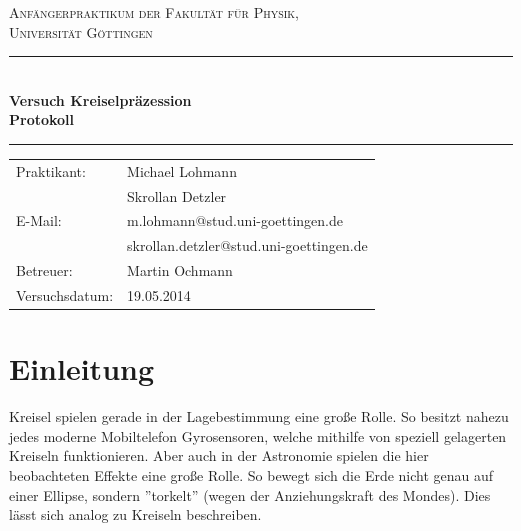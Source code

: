 \documentclass[12pt,a4paper,titlepage,headinclude,bibtotoc]{scrartcl}
\begin{document}
\begin{titlepage}
\centering
\textsc{\Large Anfängerpraktikum der Fakultät für
  Physik,\\[1.5ex] Universität Göttingen}

\vspace*{4.2cm}

\rule{\textwidth}{1pt}\\[0.5cm]
{\huge \bfseries
  Versuch Kreiselpräzession\\[1.5ex]
  Protokoll}\\[0.5cm]
\rule{\textwidth}{1pt}

\vspace*{3.5cm}

\begin{Large}
\begin{tabular}{ll}
Praktikant: &  Michael Lohmann\\
 &  Skrollan Detzler\\
 E-Mail: & m.lohmann@stud.uni-goettingen.de\\
 &  skrollan.detzler@stud.uni-goettingen.de\\
 Betreuer: & Martin Ochmann\\
 Versuchsdatum: & 19.05.2014\\
\end{tabular}
\end{Large}

\vspace*{0.8cm}

\begin{Large}
\end{Large}

\end{titlepage}

\tableofcontents

\newpage

\section{Einleitung}
\label{sec:einleitung}
Kreisel spielen gerade in der Lagebestimmung eine große Rolle.
So besitzt nahezu jedes moderne Mobiltelefon Gyrosensoren, welche mithilfe von speziell gelagerten Kreiseln funktionieren.
Aber auch in der Astronomie spielen die hier beobachteten Effekte eine große Rolle.
So bewegt sich die Erde nicht genau auf einer Ellipse, sondern ''torkelt'' (wegen der Anziehungskraft des Mondes).
Dies lässt sich analog zu Kreiseln beschreiben.
\end{document}
